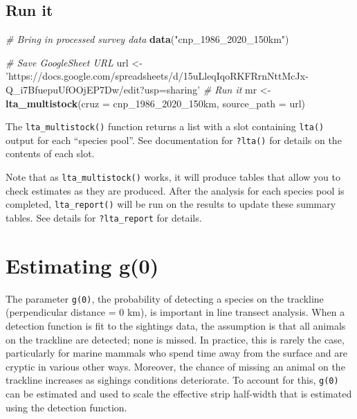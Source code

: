 \documentclass[
]{book}
\newenvironment{Shaded}{\begin{snugshade}}{\end{snugshade}}
\newcommand{\CommentTok}[1]{\textcolor[rgb]{0.56,0.35,0.01}{\textit{#1}}}
\newcommand{\DataTypeTok}[1]{\textcolor[rgb]{0.13,0.29,0.53}{#1}}
\newcommand{\DecValTok}[1]{\textcolor[rgb]{0.00,0.00,0.81}{#1}}
\newcommand{\KeywordTok}[1]{\textcolor[rgb]{0.13,0.29,0.53}{\textbf{#1}}}
\newcommand{\NormalTok}[1]{#1}
\newcommand{\StringTok}[1]{\textcolor[rgb]{0.31,0.60,0.02}{#1}}
\begin{document}
\hypertarget{run-it}{%
\section*{Run it}\label{run-it}}

\begin{Shaded}
\begin{Highlighting}[]
\CommentTok{# Bring in processed survey data}
\KeywordTok{data}\NormalTok{(}\StringTok{"cnp_1986_2020_150km"}\NormalTok{)}

\CommentTok{# Save GoogleSheet URL}
\NormalTok{url <-}\StringTok{ 'https://docs.google.com/spreadsheets/d/15uLleqIqoRKFRrnNttMcJx-Q_i7BfuepuUfOOjEP7Dw/edit?usp=sharing'}
\CommentTok{# Run it}
\NormalTok{mr <-}\StringTok{ }\KeywordTok{lta_multistock}\NormalTok{(}\DataTypeTok{cruz =}\NormalTok{ cnp_}\DecValTok{1986}\NormalTok{_}\DecValTok{2020}\NormalTok{_150km,}
                     \DataTypeTok{source_path =}\NormalTok{ url)}
\end{Highlighting}
\end{Shaded}

The \texttt{lta\_multistock()} function returns a list with a slot containing \texttt{lta()} output for each ``species pool''. See documentation for \texttt{?lta()} for details on the contents of each slot.

Note that as \texttt{lta\_multistock()} works, it will produce tables that allow you to check estimates as they are produced. After the analysis for each species pool is completed, \texttt{lta\_report()} will be run on the results to update these summary tables. See details for \texttt{?lta\_report} for details.

\hypertarget{g0}{%
\chapter{Estimating g(0)}\label{g0}}

The parameter \texttt{g(0)}, the probability of detecting a species on the trackline (perpendicular distance = 0 km), is important in line transect analysis. When a detection function is fit to the sightings data, the assumption is that all animals on the trackline are detected; none is missed. In practice, this is rarely the case, particularly for marine mammals who spend time away from the surface and are cryptic in various other ways. Moreover, the chance of missing an animal on the trackline increases as sighings conditions deteriorate. To account for this, \texttt{g(0)} can be estimated and used to scale the effective strip half-width that is estimated using the detection function.
\end{document}
